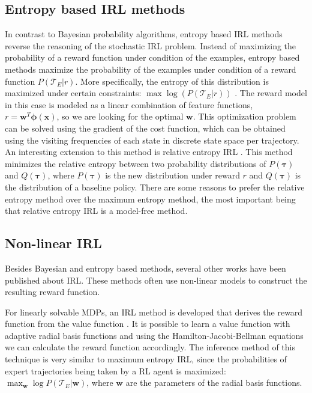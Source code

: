 \documentclass[mscThesis.tex]{subfiles}
\begin{document}
\subsection{Entropy based IRL methods}
In contrast to Bayesian probability algorithms, entropy based IRL methods reverse the reasoning of the stochastic IRL problem. Instead of maximizing the probability of a reward function under condition of the examples, entropy based methods maximize the probability of the examples under condition of a reward function $P(\mathcal{T}_E | r)$. More specifically, the entropy of this distribution is maximized under certain constraints: $\max \log (P(\mathcal{T}_E | r))$ \cite{Ziebart2008}. The reward model in this case is modeled as a linear combination of feature functions, $r = \bm{w}^T \bm{\phi}(\bm{x})$, so we are looking for the optimal $\bm{w}$. This optimization problem can be solved using the gradient of the cost function, which can be obtained using the visiting frequencies of each state in discrete state space per trajectory. An interesting extension to this method is relative entropy IRL \cite{Boularias2011}. This method minimizes the relative entropy between two probability distributions of $P(\bm{\tau})$ and $Q(\bm{\tau})$, where $P(\bm{\tau})$ is the new distribution under reward $r$ and $Q(\bm{\tau})$ is the distribution of a baseline policy. There are some reasons to prefer the relative entropy method over the maximum entropy method, the most important being that relative entropy IRL is a model-free method.

\subsection{Non-linear IRL}
Besides Bayesian and entropy based methods, several other works have been published about IRL. These methods often use non-linear models to construct the resulting reward function. 

For linearly solvable MDPs, an IRL method is developed that derives the reward function from the value function \cite{dvijotham2010inverse}. It is possible to learn a value function with adaptive radial basis functions and using the Hamilton-Jacobi-Bellman equations we can calculate the reward function accordingly. The inference method of this technique is very similar to maximum entropy IRL, since the probabilities of expert trajectories being taken by a RL agent is maximized: $\max_{\bm{w}} \log P(\mathcal{T}_E | \bm{w})$, where $\bm{w}$ are the parameters of the radial basis functions. 
\end{document}
